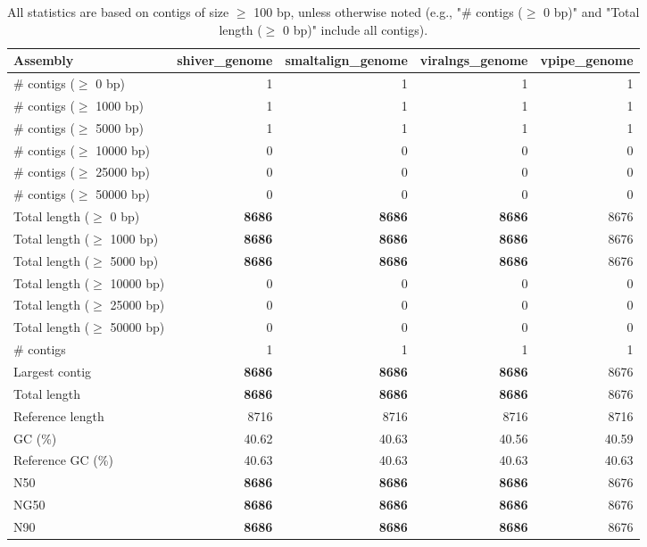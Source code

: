 \documentclass[12pt,a4paper]{article}
\begin{document}
\begin{table}[ht]
\begin{center}
\caption{All statistics are based on contigs of size $\geq$ 100 bp, unless otherwise noted (e.g., "\# contigs ($\geq$ 0 bp)" and "Total length ($\geq$ 0 bp)" include all contigs).}
\begin{tabular}{|l*{4}{|r}|}
\hline
Assembly & shiver\_genome & smaltalign\_genome & viralngs\_genome & vpipe\_genome \\ \hline
\# contigs ($\geq$ 0 bp) & 1 & 1 & 1 & 1 \\ \hline
\# contigs ($\geq$ 1000 bp) & 1 & 1 & 1 & 1 \\ \hline
\# contigs ($\geq$ 5000 bp) & 1 & 1 & 1 & 1 \\ \hline
\# contigs ($\geq$ 10000 bp) & 0 & 0 & 0 & 0 \\ \hline
\# contigs ($\geq$ 25000 bp) & 0 & 0 & 0 & 0 \\ \hline
\# contigs ($\geq$ 50000 bp) & 0 & 0 & 0 & 0 \\ \hline
Total length ($\geq$ 0 bp) & {\bf 8686} & {\bf 8686} & {\bf 8686} & 8676 \\ \hline
Total length ($\geq$ 1000 bp) & {\bf 8686} & {\bf 8686} & {\bf 8686} & 8676 \\ \hline
Total length ($\geq$ 5000 bp) & {\bf 8686} & {\bf 8686} & {\bf 8686} & 8676 \\ \hline
Total length ($\geq$ 10000 bp) & 0 & 0 & 0 & 0 \\ \hline
Total length ($\geq$ 25000 bp) & 0 & 0 & 0 & 0 \\ \hline
Total length ($\geq$ 50000 bp) & 0 & 0 & 0 & 0 \\ \hline
\# contigs & 1 & 1 & 1 & 1 \\ \hline
Largest contig & {\bf 8686} & {\bf 8686} & {\bf 8686} & 8676 \\ \hline
Total length & {\bf 8686} & {\bf 8686} & {\bf 8686} & 8676 \\ \hline
Reference length & 8716 & 8716 & 8716 & 8716 \\ \hline
GC (\%) & 40.62 & 40.63 & 40.56 & 40.59 \\ \hline
Reference GC (\%) & 40.63 & 40.63 & 40.63 & 40.63 \\ \hline
N50 & {\bf 8686} & {\bf 8686} & {\bf 8686} & 8676 \\ \hline
NG50 & {\bf 8686} & {\bf 8686} & {\bf 8686} & 8676 \\ \hline
N90 & {\bf 8686} & {\bf 8686} & {\bf 8686} & 8676 \\ \hline

\end{tabular}
\end{center}
\end{table}
\end{document}
